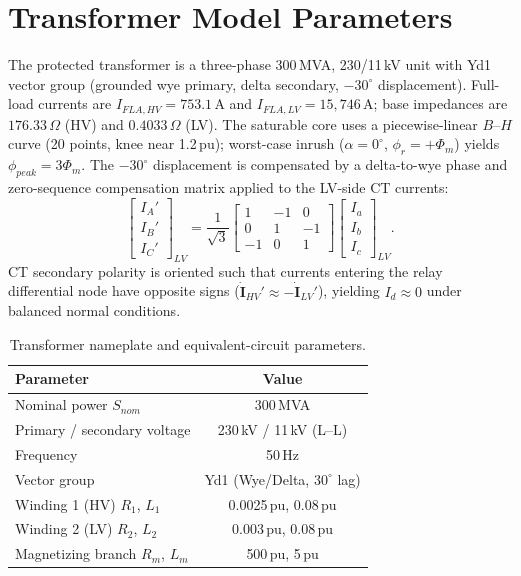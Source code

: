 \documentclass[12pt,a4paper,oneside]{report}
\begin{document}
\section{Transformer Model Parameters}
The protected transformer is a three-phase 300\,MVA, 230/11\,kV unit with Yd1 vector group (grounded wye primary, delta secondary, $-30^\circ$ displacement). Full-load currents are $I_{FLA,HV}=753.1$\,A and $I_{FLA,LV}=15{,}746$\,A; base impedances are $176.33\,\Omega$ (HV) and $0.4033\,\Omega$ (LV). The saturable core uses a piecewise-linear $B$--$H$ curve (20 points, knee near 1.2\,pu); worst-case inrush ($\alpha=0^\circ$, $\phi_r=+\Phi_m$) yields $\phi_{peak}=3\Phi_m$. The $-30^\circ$ displacement is compensated by a delta-to-wye phase and zero-sequence compensation matrix applied to the LV-side CT currents:
\begin{equation}
\begin{bmatrix} I_{A}' \\ I_{B}' \\ I_{C}' \end{bmatrix}_{LV} = \frac{1}{\sqrt{3}} \begin{bmatrix} 1 & -1 & 0 \\ 0 & 1 & -1 \\ -1 & 0 & 1 \end{bmatrix} \begin{bmatrix} I_{a} \\ I_{b} \\ I_{c} \end{bmatrix}_{LV}.
\end{equation}
CT secondary polarity is oriented such that currents entering the relay differential node have opposite signs ($\dot{\mathbf{I}}_{HV}' \approx -\dot{\mathbf{I}}_{LV}'$), yielding $I_d \approx 0$ under balanced normal conditions.
\begin{table}[H]\centering\caption{Transformer nameplate and equivalent-circuit parameters.}\label{tab:4.1}
\begin{tabular}{@{}lc@{}}\toprule \textbf{Parameter} & \textbf{Value}\\ \midrule
Nominal power $S_{nom}$ & 300\,MVA\\
Primary / secondary voltage & 230\,kV / 11\,kV (L--L)\\
Frequency & 50\,Hz\\
Vector group & Yd1 (Wye/Delta, $30^\circ$ lag)\\
Winding 1 (HV) $R_1$, $L_1$ & 0.0025\,pu, 0.08\,pu\\
Winding 2 (LV) $R_2$, $L_2$ & 0.003\,pu, 0.08\,pu\\
Magnetizing branch $R_m$, $L_m$ & 500\,pu, 5\,pu\\ \bottomrule
\end{tabular}\end{table}
\end{document}
